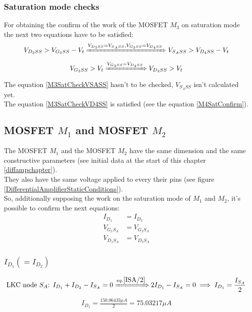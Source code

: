 \subsubsection{Saturation mode checks}
For obtaining the confirm of the work of the MOSFET $M_3$ on saturation mode the next two equations have to be satisfied:\\
\begin{align}
V_{{D_3}SS} > V_{{G_3}SS} - V_t \xRightarrow{V_{{D_3}SS} = V_{S_ASS}, V_{{G_3}SS} = V_{{D_4}SS}} V_{{S_A}SS} > V_{{D_4}SS} - V_t \label{M3SatCheckVSASS}
\end{align}
\begin{align}
V_{{G_3}SS} > V_t \xRightarrow{V_{{G_3}SS} = V_{{D_4}SS}} V_{{D_4}SS} > V_t \label{M3SatCheckVD4SS}
\end{align}
The equation \ref{M3SatCheckVSASS} hasn't to be checked, $V_{S_ASS}$ isn't calculated yet.\\
The equation \ref{M3SatCheckVD4SS} is satisfied (see the equation \ref{M4SatConfirm}).\par

\subsection{MOSFET $M_1$ and MOSFET $M_2$}
The MOSFET $M_1$ and the MOSFET $M_2$ have the same dimension and the same constructive parameters (see initial data at the start of this chapter \ref{diffampchapter}).\\
They also have the same voltage applied to every their pins (see figure \ref{DifferentialAmplifierStaticConditions}).\\
So, additionally supposing the work on the saturation mode of $M_1$ and $M_2$, it's possible to confirm the next equations:\\
\begin{align}
I_{D_1} &= I_{D_2}\label{ISA/2}\\
V_{G_1S_A} &= V_{G_2S_A}\\
V_{D_1S_A} &= V_{D_2S_A}
\end{align}

\subsubsection{$I_{D_1} (= I_{D_2})$}
\begin{align}
\text{LKC node } S_A \text{: } I_{D_1} + I_{D_2} - I_{S_A} = 0 \xRightarrow{eq. \ref{ISA/2}} 2I_{D_1} - I_{S_A} = 0 \implies I_{D_1} = \frac{I_{S_A}}{2}
\end{align}
\begin{align}
I_{D_1} = \frac{150.06433 \mu A}{2} = 75.03217 \mu A
\end{align}

